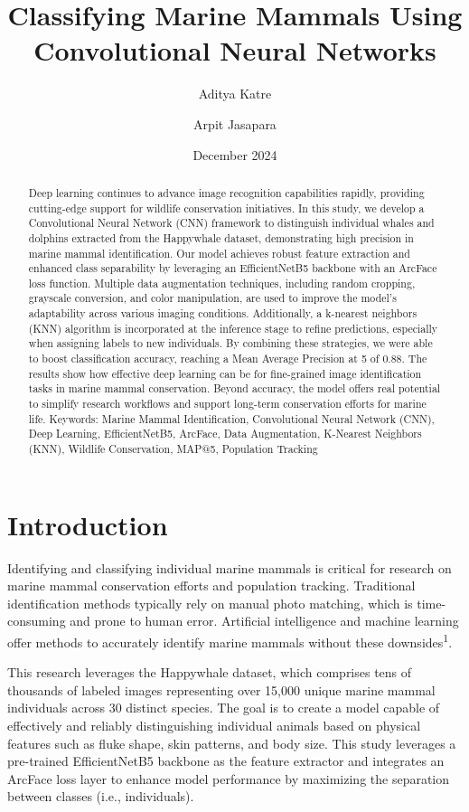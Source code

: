 \documentclass[twocolumn]{article}
\title{Classifying Marine Mammals Using Convolutional Neural Networks}
\author[1]{Aditya Katre}
\author[2]{Arpit Jasapara}
\affil[1]{Del Norte High, San Diego, California}
\affil[2]{University of California Los Angeles, Los Angeles, California}
\date{December 2024}
\begin{document}
\maketitle
\begin{abstract}
Deep learning continues to advance image recognition capabilities rapidly, providing cutting-edge support for wildlife conservation initiatives. In this study, we develop a Convolutional Neural Network (CNN) framework to distinguish individual whales and dolphins extracted from the Happywhale dataset, demonstrating high precision in marine mammal identification. Our model achieves robust feature extraction and enhanced class separability by leveraging an EfficientNetB5 backbone with an ArcFace loss function. Multiple data augmentation techniques, including random cropping, grayscale conversion, and color manipulation, are used to improve the model’s adaptability across various imaging conditions. Additionally, a k-nearest neighbors (KNN) algorithm is incorporated at the inference stage to refine predictions, especially when assigning labels to new individuals. By combining these strategies, we were able to boost classification accuracy, reaching a Mean Average Precision at 5 of 0.88. The results show how effective deep learning can be for fine-grained image identification tasks in marine mammal conservation. Beyond accuracy, the model offers real potential to simplify research workflows and support long-term conservation efforts for marine life.
\newline
\newline
Keywords: Marine Mammal Identification, Convolutional Neural Network (CNN), Deep Learning, EfficientNetB5, ArcFace, Data Augmentation, K-Nearest Neighbors (KNN), Wildlife Conservation, MAP@5, Population Tracking
\end{abstract}

\section{Introduction}
Identifying and classifying individual marine mammals is critical for research on marine mammal conservation efforts and population tracking. Traditional identification methods typically rely on manual photo matching, which is time-consuming and prone to human error. Artificial intelligence and machine learning offer methods to accurately identify marine mammals without these downsides\textsuperscript{1}.

This research leverages the Happywhale dataset, which comprises tens of thousands of labeled images representing over 15,000 unique marine mammal individuals across 30 distinct species. The goal is to create a model capable of effectively and reliably distinguishing individual animals based on physical features such as fluke shape, skin patterns, and body size. This study leverages a pre-trained EfficientNetB5 backbone as the feature extractor and integrates an ArcFace loss layer to enhance model performance by maximizing the separation between classes (i.e., individuals).
\end{document}
